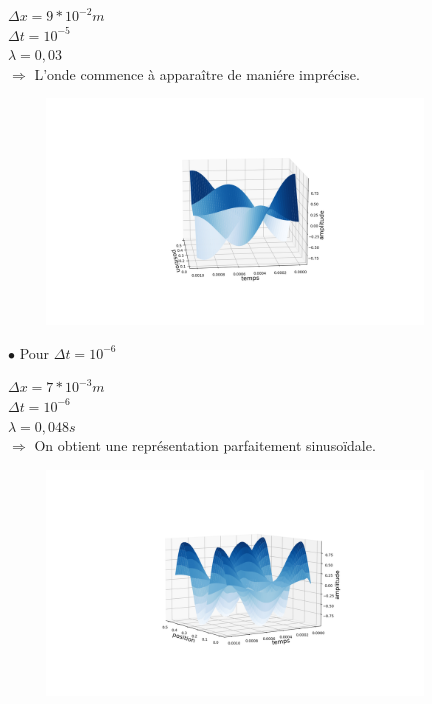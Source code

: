 \begin{enumerate}[label=\alph*)]
\begin{minipage}{.45\textwidth}%
\item $\Delta x=9*{10}^{-2}m$\\
$\Delta t={10}^{-5}$\\
$\lambda= 0,03$ \\
$\Longrightarrow$ L'onde commence à apparaître de maniére imprécise.
\end{minipage}%
\hfill
\begin{minipage}{.6\textwidth}%
\includegraphics[width=12cm,height=6cm]{dt=0.00001 et dx=0.09.png}
\end{minipage}%

\hspace*{1cm}$\bullet$ Pour $\Delta t= {10}^{-6}$ \\
\begin{minipage}{.45\textwidth}%

\item $\Delta x=7*{10}^{-3}m$ \\
$\Delta t= {10}^{-6}$ \\
$\lambda=0,048s $\\


$\Longrightarrow$ On obtient une représentation parfaitement sinusoïdale.

\end{minipage}%
\hfill
\begin{minipage}{.6\textwidth}%

\includegraphics[width=12cm,height=6cm]{dt=10^-6 avec dx= 0.007 .png}
\end{minipage}


\end{enumerate}

